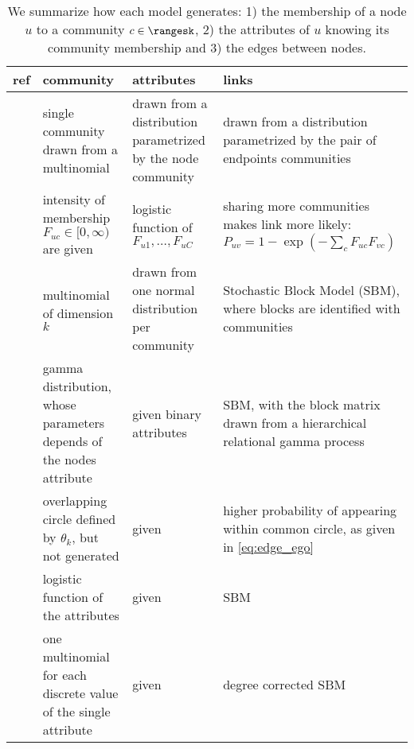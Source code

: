 \setlength{\fullpage}{179mm}
\begin{table*}[tbh]
\begin{adjustwidth}{-2cm}{}
  \centering
  \small
  \caption{We summarize how each model generates: 1) the membership of a node $u$ to a community $c
  \in \rangesk$, 2) the attributes of $u$ knowing its community membership and 3) the edges between
nodes.}
  \label{tab:edge_genmodel}
  \bgroup
  \def\arraystretch{1.5}
  \begin{tabulary}{\fullpage}{LLLL}
    \toprule
    ref & community & attributes & links \\
    \midrule

    \autocite{Xu2014} &
    single community drawn from a multinomial &
    drawn from a distribution parametrized by the node community &
    drawn from a distribution parametrized by the pair of endpoints communities \\

    \autocite{Yang2013} &
    intensity of membership $F_{uc} \in [0, \infty)$ are given &
    logistic function of $F_{u1},\ldots,F_{uC}$ &
    sharing more communities makes link more likely:
    $P_{uv} = 1-\exp(-\sum_c F_{uc}F_{vc})$ \\

    \autocite{Kataoka2016} &
    multinomial of dimension $k$ &
    drawn from one normal distribution per community &
    Stochastic Block Model (SBM), where blocks are identified with communities \\

    \midrule

    \autocite{Zhao2017} &
    gamma distribution, whose parameters depends of the nodes attribute &
    given binary attributes &
    SBM, with the block matrix drawn from a hierarchical relational gamma process \\

    \autocites{LeskovecEgo12}{LeskovecEgo14} &
    overlapping circle defined by $\theta_k$, but not generated &
    given &
    higher probability of appearing within common circle, as given in \eqref{eq:edge_ego} \\

    \autocite{Weng2016} &
    logistic function of the attributes &
    given &
    SBM \\

    \autocite{Newman2016} &
    one multinomial for each discrete value of the single attribute &
    given &
    degree corrected SBM \\
    \bottomrule
  \end{tabulary}
  \egroup
\end{adjustwidth}
\end{table*}

